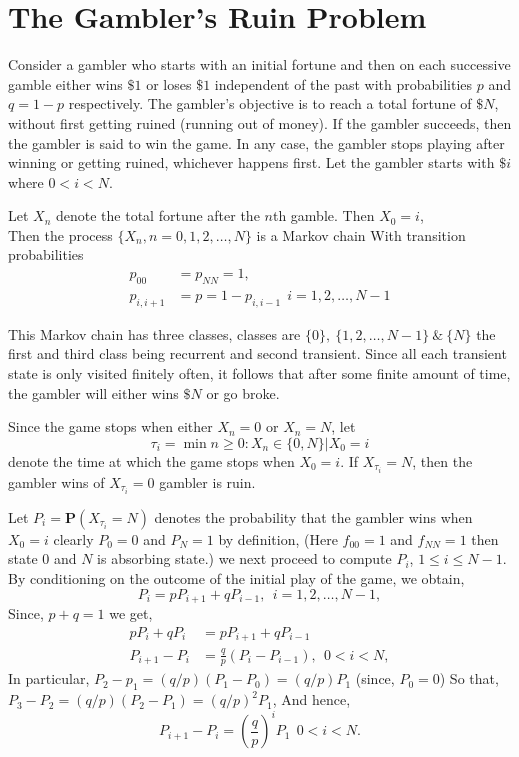 \section{The Gambler's Ruin Problem}
Consider a gambler who starts with an initial fortune and then on each successive gamble
either wins $\$1$ or loses $\$1$ independent of the past with probabilities $p$ and $q = 1-p$ respectively.
The gambler’s objective is to reach a total fortune of $\$N$, without first getting ruined (running out of money). If the gambler succeeds,
then the gambler is said to win the game. In any case, the gambler stops playing after winning
or getting ruined, whichever happens first. Let the gambler starts with $\$i$ where $0 < i < N$.

Let $X_{n}$ denote the total fortune after the $n$th gamble. Then $X_{0}=i$, \\
Then the process $ \{X_{n},n=0,1,2,\ldots,N\} $ is a Markov chain With 
transition probabilities
\begin{align*}
    p_{00} &= p_{N N} = 1,\\ 
    p_{i,i+1} &= p = 1-p_{i,i-1} \ \ i=1,2,\ldots,N-1
\end{align*}

This Markov chain has three classes, classes are $ \{0\},\ \{1,2,\ldots,N-1\}\ \&\ \{N\} $ the first and third class being recurrent and 
second transient. Since all each transient state is only visited finitely often, it follows that after some finite amount of time, the gambler
will either wins $ \$N $ or go broke.

Since the game stops when either $X_{n} = 0$ or $X_{n} = N$, let
\[
    \tau_{i} = \min{n\ge 0: X_{n}\in\{0,N\}|X_{0}=i} 
\]
denote the time at which the game stops when $ X_{0} = i $. If $ X_{\tau_{i}} = N $, then the gambler wins of $ X_{\tau_{i}} = 0 $ gambler is ruin.

Let $ P_{i} = \mathbf{P}(X_{\tau_{i}} = N) $ denotes the probability that the gambler wins when $ X_{0} = i $ clearly $ P_{0} = 0 $ and $ P_{N} = 1 $ 
by definition, (Here $ f_{00}=1  $ and $ f_{N N}=1 $ then state 0 and $ N $ is absorbing state.) 
we next proceed to compute $P_i$, $1 \le  i \le  N - 1$. By conditioning on the outcome of the initial play of the game, we obtain,
\[
    P_{i} = pP_{i+1} + qP_{i-1}, \ \ i=1,2,\ldots,N-1,
\]
Since, $ p + q = 1 $ we get, 
\begin{align*}
    pP_{i} + qP_{i} &= pP_{i+1} + qP_{i-1}\\ 
    P_{i+1} - P_{i} &= \frac{q}{p}(P_{i}-P_{i-1}), \ \ 0<i<N,
\end{align*}
In particular, $ P_{2}-p_{1}=(q/p)(P_{1}-P_{0})=(q/p)P_{1} $ (since, $ P_{0} = 0 $) So that,\\ 
$ P_{3}-P_{2}=(q/p)(P_{2}-P_{1}) = (q/p)^{2}P_{1}$, And hence,
\begin{equation*}
    P_{i+1} -P_{i} = \left( \frac{q}{p} \right)^{i}P_{1}\ \  0<i<N.
\end{equation*}

